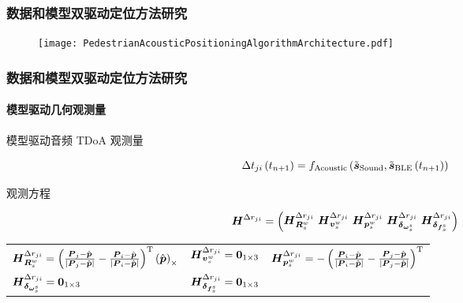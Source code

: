 \begin{frame}
	\frametitle{数据和模型双驱动定位方法研究}	
   	\begin{figure}
   	\centering
   	    \texttt{[image: PedestrianAcousticPositioningAlgorithmArchitecture.pdf]}
   	\end{figure} 
\end{frame}

\begin{frame}

	\frametitle{数据和模型双驱动定位方法研究}	
	\framesubtitle{模型驱动几何观测量}
	
	{\small
		模型驱动音频 TDoA 观测量
		
		\begin{equation*}
			\Delta t_{ji}\left(t_{n+1}\right)
			=
			f_{\mathrm{Acoustic}}\left(\tilde{\vb*{s}}_{\mathrm{Sound}},\tilde{\vb*{s}}_{\mathrm{BLE}}\left(t_{n+1}\right)\right)
		\end{equation*}
				
		观测方程
		
		\begin{equation*}
			\vb*{H}^{\Delta r_{ji}} 
			= 
			\begin{pmatrix}
				\vb*{H}^{\Delta r_{ji}}_{\vb*{R}_s^w}
				~\vb*{H}^{\Delta r_{ji}}_{\vb*{v}_s^w}
				~\vb*{H}^{\Delta r_{ji}}_{\vb*{p}_s^w}
				~\vb*{H}^{\Delta r_{ji}}_{\vb*{\delta}_{\vb*{\omega}_s^s}} 
				~\vb*{H}^{\Delta r_{ji}}_{\vb*{\delta}_{\vb*{f}_s^s}} 
			\end{pmatrix}
		\end{equation*}
		
		\begin{center}
			\begin{tabular*}{\linewidth}{@{\extracolsep{\fill}}lll}
	            $ \vb*{H}^{\Delta r_{ji}} _{\vb*{R}_s^w}
	            =
       			\left(\frac{\vb*{P}_j-\hat{\vb*{p}}}{\left|\vb*{P}_j-\hat{\vb*{p}}\right|} - \frac{\vb*{P}_i-\hat{\vb*{p}}}{\left|\vb*{P}_i-\hat{\vb*{p}}\right|}\right)^{\mathrm{T}} \left(\hat{\vb*{p}}\right)_{\times}  $ 
	            & $ \vb*{H}^{\Delta r_{ji}} _{\vb*{v}_s^w} = \vb*{0}_{1 \times 3} $ 
	            & $ \vb*{H}^{\Delta r_{ji}} _{\vb*{p}_s^w}
       			=
       			-\left(\frac{\vb*{P}_i-\hat{\vb*{p}}}{\left|\vb*{P}_i-\hat{\vb*{p}}\right|}-\frac{\vb*{P}_j-\hat{\vb*{p}}}{\left|\vb*{P}_j-\hat{\vb*{p}}\right|}\right)^{\mathrm{T}} $
	            \\
	            $ \vb*{H}^{\Delta r_{ji}} _{\vb*{\delta}_{\vb*{\omega}_s^s}} = \vb*{0}_{1 \times 3} $ 
	            & $ \vb*{H}^{\Delta r_{ji}}_{\vb*{\delta}_{\vb*{f}_s^s}} = \vb*{0}_{1 \times 3} $ 
	            & 
	   		\end{tabular*}
   		\end{center} 

	}
 
 \end{frame}
 
